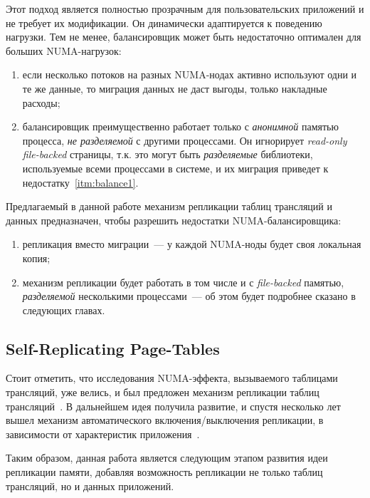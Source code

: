 Этот подход является полностью прозрачным для пользовательских приложений и не требует их модификации. Он динамически адаптируется к поведению нагрузки. Тем не менее, балансировщик может быть недостаточно оптимален для больших NUMA-нагрузок:
\begin{enumerate}
    \item\label{itm:balance1} если несколько потоков на разных NUMA-нодах активно используют одни и те же данные, то миграция данных не даст выгоды, только накладные расходы;
    \item балансировщик преимущественно работает только с \textit{анонимной} памятью процесса, \textit{не разделяемой} с другими процессами. Он игнорирует \textit{read-only file-backed} страницы, т.к. это могут быть \textit{разделяемые} библиотеки, используемые всеми процессами в системе, и их миграция приведет к недостатку~\ref{itm:balance1}.
\end{enumerate}

Предлагаемый в данной работе механизм репликации таблиц трансляций и данных предназначен, чтобы разрешить недостатки NUMA-балансировщика:
\begin{enumerate}
    \item репликация вместо миграции~--- у каждой NUMA-ноды будет своя локальная копия;
    \item механизм репликации будет работать в том числе и с \textit{file-backed} памятью, \textit{разделяемой} несколькими процессами~--- об этом будет подробнее сказано в следующих главах.
\end{enumerate}

\subsection{Self-Replicating Page-Tables}

Стоит отметить, что исследования NUMA-эффекта, вызываемого таблицами трансляций, уже велись, и был предложен механизм репликации таблиц трансляций~\cite{Mitosis}. В дальнейшем идея получила развитие, и спустя несколько лет вышел механизм автоматического включения/выключения репликации, в зависимости от характеристик приложения~\cite{WASP}.

Таким образом, данная работа является следующим этапом развития идеи репликации памяти, добавляя возможность репликации не только таблиц трансляций, но и данных приложений.
